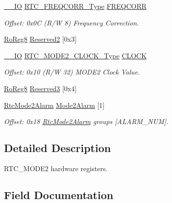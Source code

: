\begin{DoxyCompactItemize}
\mbox{\hyperlink{core__cm0plus_8h_aec43007d9998a0a0e01faede4133d6be}{\+\_\+\+\_\+\+IO}} \mbox{\hyperlink{union_r_t_c___f_r_e_q_c_o_r_r___type}{R\+T\+C\+\_\+\+F\+R\+E\+Q\+C\+O\+R\+R\+\_\+\+Type}} \mbox{\hyperlink{struct_rtc_mode2_a6895b43aadf5f05e11817146109d789a}{F\+R\+E\+Q\+C\+O\+RR}}
\begin{DoxyCompactList}\small\item\em Offset\+: 0x0C (R/W 8) Frequency Correction. \end{DoxyCompactList}\item 
\mbox{\hyperlink{group___s_a_m_d21_e15_a__definitions_ga0d957f1433aaf5d70e4dc2b68288442d}{Ro\+Reg8}} \mbox{\hyperlink{struct_rtc_mode2_a3e3d4b7e35d84b272d434a1396e8b7be}{Reserved2}} \mbox{[}0x3\mbox{]}
\item 
\mbox{\hyperlink{core__cm0plus_8h_aec43007d9998a0a0e01faede4133d6be}{\+\_\+\+\_\+\+IO}} \mbox{\hyperlink{union_r_t_c___m_o_d_e2___c_l_o_c_k___type}{R\+T\+C\+\_\+\+M\+O\+D\+E2\+\_\+\+C\+L\+O\+C\+K\+\_\+\+Type}} \mbox{\hyperlink{struct_rtc_mode2_af478e0819440c0cd114dc276396b9296}{C\+L\+O\+CK}}
\begin{DoxyCompactList}\small\item\em Offset\+: 0x10 (R/W 32) M\+O\+D\+E2 Clock Value. \end{DoxyCompactList}\item 
\mbox{\hyperlink{group___s_a_m_d21_e15_a__definitions_ga0d957f1433aaf5d70e4dc2b68288442d}{Ro\+Reg8}} \mbox{\hyperlink{struct_rtc_mode2_a85a9b205a274d973876024028f9ec39b}{Reserved3}} \mbox{[}0x4\mbox{]}
\item 
\mbox{\hyperlink{struct_rtc_mode2_alarm}{Rtc\+Mode2\+Alarm}} \mbox{\hyperlink{struct_rtc_mode2_a9da280aa59724fb4a83265239b9d214e}{Mode2\+Alarm}} \mbox{[}1\mbox{]}
\begin{DoxyCompactList}\small\item\em Offset\+: 0x18 \mbox{\hyperlink{struct_rtc_mode2_alarm}{Rtc\+Mode2\+Alarm}} groups \mbox{[}A\+L\+A\+R\+M\+\_\+\+N\+UM\mbox{]}. \end{DoxyCompactList}\end{DoxyCompactItemize}


\subsection{Detailed Description}
R\+T\+C\+\_\+\+M\+O\+D\+E2 hardware registers. 

\subsection{Field Documentation}
\mbox{\label{struct_rtc_mode2_af478e0819440c0cd114dc276396b9296}} 
